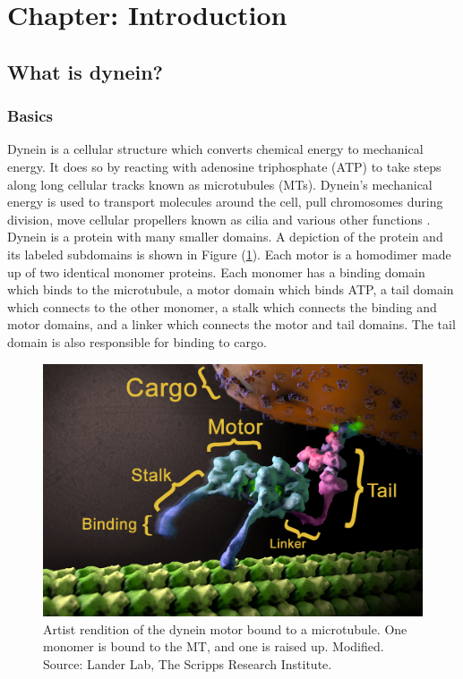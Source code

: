 \documentclass[10pt]{article} %
\begin{document}
\tableofcontents
\newpage

\section{Chapter: Introduction}
\subsection{What is dynein?}
\subsubsection{Basics}

Dynein is a cellular structure which converts chemical energy to mechanical energy. It does so by reacting with adenosine triphosphate (ATP) to take steps along long cellular tracks known as microtubules (MTs). Dynein's mechanical energy is used to transport molecules around the cell, pull chromosomes during division, move cellular propellers known as cilia and various other functions \cite{cianfroccoreview}.\\

Dynein is a protein with many smaller domains. A depiction of the protein and its labeled subdomains is shown in Figure (\ref{dynein-artist-rendition}). Each motor is a homodimer made up of two identical monomer proteins. Each monomer has a binding domain which binds to the microtubule, a motor domain which binds ATP, a tail domain which connects to the other monomer, a stalk which connects the binding and motor domains, and a linker which connects the motor and tail domains. The tail domain is also responsible for binding to cargo.\\

\begin{figure}[h]
  \centering
  \includegraphics[width=.65\textwidth,keepaspectratio]{../../figures/dynein-artist-rendition.jpg}
  \caption{Artist rendition of the dynein motor bound to a microtubule. One monomer is bound to the MT, and one is raised up. Modified. Source: Lander Lab, The Scripps Research Institute.}
  \label{dynein-artist-rendition}
\end{figure}
\end{document}

